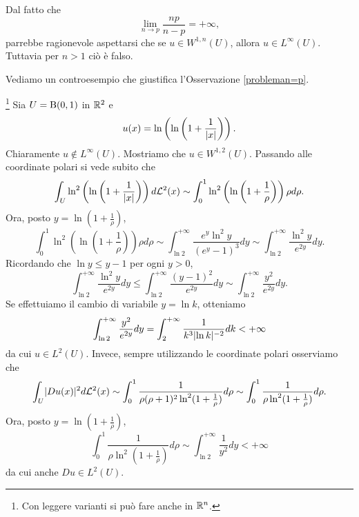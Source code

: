 \begin{osservazione}\label{probleman=p}
	Dal fatto che 
	\[ \lim\limits_{n \to p} \frac{np}{n-p} = +\infty, \]
	parrebbe ragionevole aspettarsi che se $u \in W^{1,n}(U)$, allora $u \in L^\infty(U)$. Tuttavia per $n > 1$ ciò è falso.
\end{osservazione}

Vediamo un controesempio che giustifica l'Osservazione \eqref{probleman=p}.
\begin{esempio}\footnote{Con leggere varianti si può fare anche in $\mathbb{R}^n$.}
	Sia $U = \textup{B}(0,1)$ in $\mathbb{R}^2$ e 
	\[ u(x) = \ln \left( \ln \left( 1 + \frac{1}{\lvert x\rvert}\right)\right)  . \]
	Chiaramente $u \notin L^\infty(U)$. Mostriamo che $u \in W^{1,2}(U)$. Passando alle coordinate polari si vede subito che
	\[ \int_{U} \ln^2 \left( \ln \left( 1 + \frac{1}{\lvert x\rvert}\right)\right)d\mathcal{L}^2(x) \sim \int_{0}^{1} \ln^2 \left( \ln \left( 1 + \frac{1}{\rho}\right)\right)\rho d\rho.  \]
	Ora, posto $y =\ln \left( 1 + \frac{1}{\rho}\right)$,
	\[ \int_{0}^{1} \ln^2 \left( \ln \left( 1 + \frac{1}{\rho}\right)\right)\rho d\rho \sim \int_{\ln 2}^{+\infty} \dfrac{e^y \ln^2 y}{(e^y-1)^3} dy \sim \int_{\ln 2}^{+\infty} \frac{\ln^2 y}{e^{2y}} dy. \]
	Ricordando che $\ln y \le y-1$ per ogni $y > 0$, 
	\[ \int_{\ln 2}^{+\infty} \frac{\ln^2 y}{e^{2y}} dy \le  \int_{\ln 2}^{+\infty} \frac{(y-1)^2}{e^{2y}} dy  \sim \int_{\ln 2}^{+\infty} \frac{y^2}{e^{2y}} dy. \]
	Se effettuiamo il cambio di variabile $y = \ln k$, otteniamo 
	\[ \int_{\ln 2}^{+\infty} \frac{y^2}{e^{2y}} dy = \int_{2}^{+\infty} \frac{1}{k^3\lvert\ln k\rvert^{-2}}dk < +\infty \]
	da cui $u \in L^2(U)$. Invece, sempre utilizzando le coordinate polari osserviamo che
	\[ \int_{U} \lvert Du(x)\rvert^2d\mathcal{L}^2(x) \sim \int_{0}^{1} \dfrac{1}{\rho(\rho + 1)^2\ln^2(1+\frac{1}{\rho})} d\rho \sim \int_{0}^{1} \frac{1}{\rho \ln^2(1+\frac{1}{\rho})} d\rho. \]
	Ora, posto $y =\ln \left( 1 + \frac{1}{\rho}\right)$,
	\[ \int_{0}^{1} \frac{1}{\rho \ln^2(1+\frac{1}{\rho})} d\rho \sim \int_{\ln 2}^{+\infty} \frac{1}{y^2} dy < +\infty \]
	da cui anche $Du \in L^2(U)$.  
\end{esempio}

